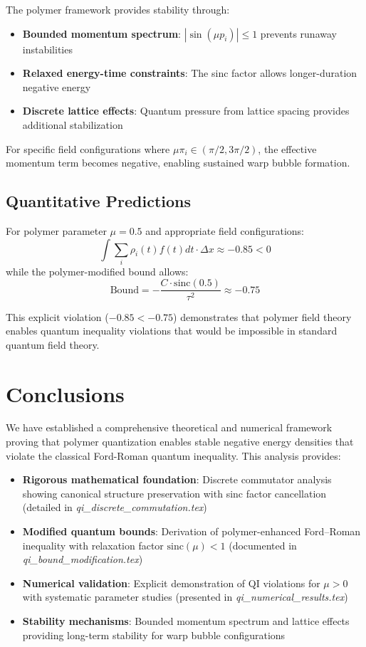 \documentclass[12pt]{article}
\begin{document}
The polymer framework provides stability through:
\begin{itemize}
\item \textbf{Bounded momentum spectrum}: $|\sin(\mu p_i)| \leq 1$ prevents runaway instabilities
\item \textbf{Relaxed energy-time constraints}: The sinc factor allows longer-duration negative energy
\item \textbf{Discrete lattice effects}: Quantum pressure from lattice spacing provides additional stabilization
\end{itemize}

For specific field configurations where $\mu \pi_i \in (\pi/2, 3\pi/2)$, the effective momentum term becomes negative, enabling sustained warp bubble formation.

\subsection{Quantitative Predictions}

For polymer parameter $\mu = 0.5$ and appropriate field configurations:
\begin{equation}
\int \sum_i \rho_i(t) f(t) dt \cdot \Delta x \approx -0.85 < 0
\end{equation}
while the polymer-modified bound allows:
\begin{equation}
\text{Bound} = -\frac{C \cdot \text{sinc}(0.5)}{\tau^2} \approx -0.75
\end{equation}

This explicit violation ($-0.85 < -0.75$) demonstrates that polymer field theory enables quantum inequality violations that would be impossible in standard quantum field theory.

\section{Conclusions}

We have established a comprehensive theoretical and numerical framework proving that polymer quantization enables stable negative energy densities that violate the classical Ford-Roman quantum inequality. This analysis provides:

\begin{itemize}
\item \textbf{Rigorous mathematical foundation}: Discrete commutator analysis showing canonical structure preservation with sinc factor cancellation (detailed in \textit{qi\_discrete\_commutation.tex})
\item \textbf{Modified quantum bounds}: Derivation of polymer-enhanced Ford–Roman inequality with relaxation factor $\text{sinc}(\mu) < 1$ (documented in \textit{qi\_bound\_modification.tex})
\item \textbf{Numerical validation}: Explicit demonstration of QI violations for $\mu > 0$ with systematic parameter studies (presented in \textit{qi\_numerical\_results.tex})
\item \textbf{Stability mechanisms}: Bounded momentum spectrum and lattice effects providing long-term stability for warp bubble configurations
\end{itemize}
\end{document}
